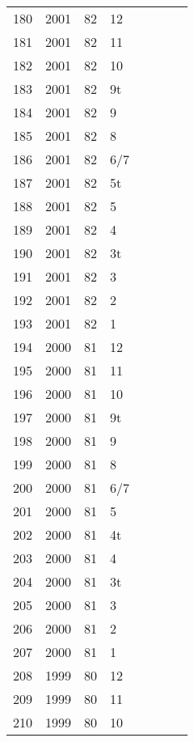 \begin{longtable}{ |l|l|l|l|l|l|l|l| }
180 & 2001 & 82 &    12 &         &  &  & \\
181 & 2001 & 82 &    11 &         &  &  & \\
182 & 2001 & 82 &    10 &         &  &  & \\
183 & 2001 & 82 &    9t &         &  &  & \\
184 & 2001 & 82 &     9 &         &  &  & \\
185 & 2001 & 82 &     8 &         &  &  & \\
186 & 2001 & 82 &   6/7 &         &  &  & \\
187 & 2001 & 82 &    5t &         &  &  & \\
188 & 2001 & 82 &     5 &         &  &  & \\
189 & 2001 & 82 &     4 &         &  &  & \\
190 & 2001 & 82 &    3t &         &  &  & \\
191 & 2001 & 82 &     3 &         &  &  & \\
192 & 2001 & 82 &     2 &         &  &  & \\
193 & 2001 & 82 &     1 &         &  &  & \\
194 & 2000 & 81 &    12 &         &  &  & \\
195 & 2000 & 81 &    11 &         &  &  & \\
196 & 2000 & 81 &    10 &         &  &  & \\
197 & 2000 & 81 &    9t &         &  &  & \\
198 & 2000 & 81 &     9 &         &  &  & \\
199 & 2000 & 81 &     8 &         &  &  & \\
200 & 2000 & 81 &   6/7 &         &  &  & \\
201 & 2000 & 81 &     5 &         &  &  & \\
202 & 2000 & 81 &    4t &         &  &  & \\
203 & 2000 & 81 &     4 &         &  &  & \\
204 & 2000 & 81 &    3t &         &  &  & \\
205 & 2000 & 81 &     3 &         &  &  & \\
206 & 2000 & 81 &     2 &         &    &  & \\
207 & 2000 & 81 &     1 &         &  &  & \\
208 & 1999 & 80 &    12 &         &  &  & \\
209 & 1999 & 80 &    11 &         &  &  & \\
210 & 1999 & 80 &    10 &         &  &  & \\

\end{longtable}
